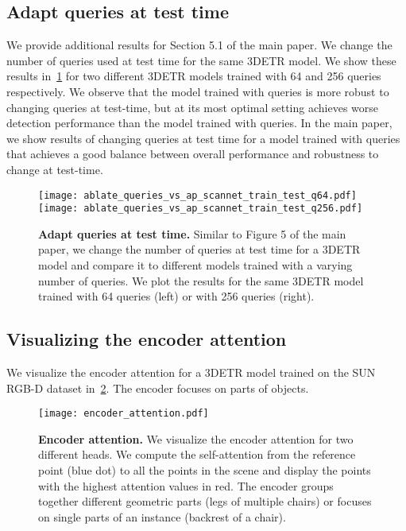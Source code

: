 \documentclass[10pt,twocolumn,letterpaper]{article}
\newcommand{\OURS}{3DETR\xspace}
\newcommand{\sunrgbd}{SUN RGB-D\xspace}
\begin{document}
\subsection{Adapt queries at test time}
We provide additional results for Section 5.1 of the main paper.
We change the number of queries used at test time for the same \OURS model.
We show these results in~\cref{fig:queries_test_time_extra} for two different \OURS models trained with 64 and 256 queries respectively.
We observe that the model trained with  queries is more robust to changing queries at test-time, but at its most optimal setting achieves worse detection performance than the model trained with  queries.
In the main paper, we show results of changing queries at test time for a model trained with  queries that achieves a good balance between overall performance and robustness to change at test-time.

\begin{figure}
\texttt{[image: ablate\_queries\_vs\_ap\_scannet\_train\_test\_q64.pdf]}
\texttt{[image: ablate\_queries\_vs\_ap\_scannet\_train\_test\_q256.pdf]}
\caption{\textbf{Adapt queries at test time.} Similar to Figure 5 of the main paper, we change the number of queries at test time for a \OURS model and compare it to different models trained with a varying number of queries.
We plot the results for the same \OURS model trained with 64 queries (left) or with 256 queries (right).
\label{fig:queries_test_time_extra}
}
\end{figure}


\subsection{Visualizing the encoder attention}
We visualize the encoder attention for a \OURS model trained on the \sunrgbd dataset in~\cref{fig:encoder_attention}.
The encoder focuses on parts of objects.

\begin{figure}
\centering
\texttt{[image: encoder\_attention.pdf]}
\caption{\textbf{Encoder attention.} We visualize the encoder attention for two different heads.
We compute the self-attention from the reference point (blue dot) to all the points in the scene and display the points with the highest attention values in red.
The encoder groups together different geometric parts (legs of multiple chairs) or focuses on single parts of an instance (backrest of a chair).
\label{fig:encoder_attention}}
\end{figure}
\end{document}
